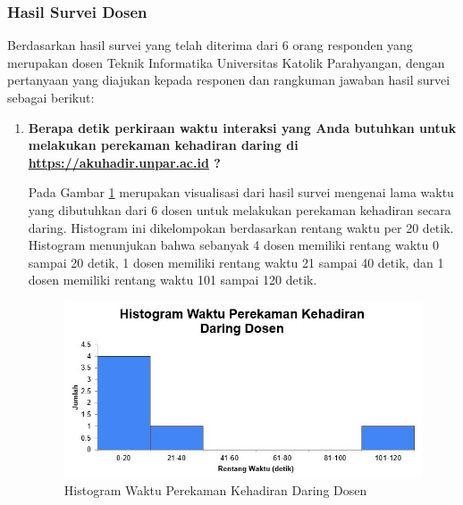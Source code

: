 \subsubsection{Hasil Survei Dosen} 
Berdasarkan hasil survei yang telah diterima dari 6 orang responden yang merupakan dosen Teknik Informatika Universitas Katolik Parahyangan, dengan pertanyaan yang diajukan kepada responen dan rangkuman jawaban hasil survei sebagai berikut:
\begin{enumerate}
	\item \textbf{Berapa detik perkiraan waktu interaksi yang Anda butuhkan untuk melakukan perekaman kehadiran daring di \url{https://akuhadir.unpar.ac.id} ?}
	
	Pada Gambar \ref{fig:DaringDosen} merupakan visualisasi dari hasil survei mengenai lama waktu yang dibutuhkan dari 6 dosen untuk melakukan perekaman kehadiran secara daring. Histogram ini dikelompokan berdasarkan rentang waktu per 20 detik. Histogram menunjukan bahwa sebanyak 4 dosen memiliki rentang waktu 0 sampai 20 detik, 1 dosen memiliki rentang waktu 21 sampai 40 detik, dan 1 dosen memiliki rentang waktu 101 sampai 120 detik. 
		\begin{figure}[H] 
		\centering
		\includegraphics[scale=0.7]{Gambar/DaringDosen.jpg}
		\caption{Histogram Waktu Perekaman Kehadiran Daring Dosen} 
		\label{fig:DaringDosen}
	\end{figure}
	

\end{enumerate}

